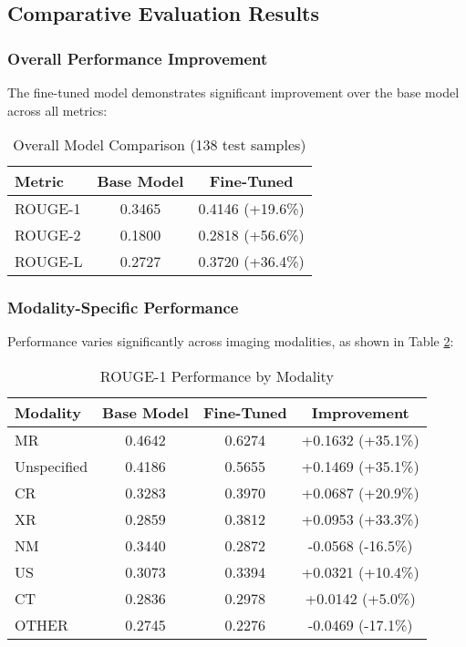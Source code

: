 \documentclass[11pt,letterpaper]{article}
\begin{document}
\subsection{Comparative Evaluation Results}

\subsubsection{Overall Performance Improvement}
The fine-tuned model demonstrates significant improvement over the base model across all metrics:

\begin{table}[h]
\centering
\caption{Overall Model Comparison (138 test samples)}
\label{tab:overall_comparison}
\begin{tabular}{@{}lcc@{}}
\toprule
\textbf{Metric} & \textbf{Base Model} & \textbf{Fine-Tuned} \\
\midrule
ROUGE-1 & 0.3465 & 0.4146 (+19.6\%) \\
ROUGE-2 & 0.1800 & 0.2818 (+56.6\%) \\
ROUGE-L & 0.2727 & 0.3720 (+36.4\%) \\
\bottomrule
\end{tabular}
\end{table}

\subsubsection{Modality-Specific Performance}
Performance varies significantly across imaging modalities, as shown in Table \ref{tab:modality_comparison}:

\begin{table}[h]
\centering
\caption{ROUGE-1 Performance by Modality}
\label{tab:modality_comparison}
\begin{tabular}{@{}lccc@{}}
\toprule
\textbf{Modality} & \textbf{Base Model} & \textbf{Fine-Tuned} & \textbf{Improvement} \\
\midrule
MR & 0.4642 & 0.6274 & +0.1632 (+35.1\%) \\
Unspecified & 0.4186 & 0.5655 & +0.1469 (+35.1\%) \\
CR & 0.3283 & 0.3970 & +0.0687 (+20.9\%) \\
XR & 0.2859 & 0.3812 & +0.0953 (+33.3\%) \\
NM & 0.3440 & 0.2872 & -0.0568 (-16.5\%) \\
US & 0.3073 & 0.3394 & +0.0321 (+10.4\%) \\
CT & 0.2836 & 0.2978 & +0.0142 (+5.0\%) \\
OTHER & 0.2745 & 0.2276 & -0.0469 (-17.1\%) \\
\bottomrule
\end{tabular}
\end{table}
\end{document}
